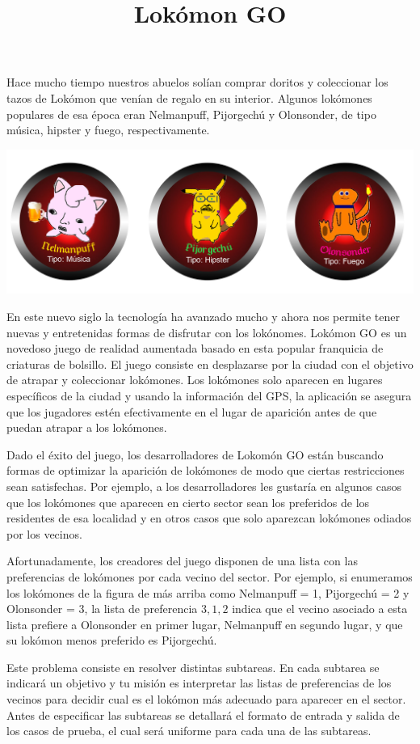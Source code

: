 \documentclass{oci}
\title{Lokómon GO}
\begin{document}
\begin{problemDescription}
Hace mucho tiempo nuestros abuelos solían comprar doritos y coleccionar los
tazos de Lokómon que venían de regalo en su interior.
Algunos lokómones populares de esa época eran Nelmanpuff, Pijorgechú
y Olonsonder, de tipo música, hipster y fuego, respectivamente.

\begin{center}
	\includegraphics[scale=0.4]{lokomons.jpg}
\end{center}

En este nuevo siglo la tecnología ha avanzado mucho y ahora nos permite tener
nuevas y entretenidas formas de disfrutar con los lokónomes.
Lokómon GO es un novedoso juego de realidad aumentada basado en esta popular
franquicia de criaturas de bolsillo.
El juego consiste en desplazarse por la ciudad con el objetivo de atrapar y
coleccionar lokómones.
Los lokómones solo aparecen en lugares específicos de la ciudad y usando la
información del GPS, la aplicación se asegura que los jugadores estén
efectivamente en el lugar de aparición antes de que puedan atrapar a los
lokómones.

Dado el éxito del juego, los desarrolladores de Lokomón GO están buscando formas
de optimizar la aparición de lokómones de modo que ciertas restricciones sean
satisfechas.
Por ejemplo, a los desarrolladores les gustaría en algunos casos que los
lokómones que aparecen en cierto sector sean los preferidos de los residentes de
esa localidad y en otros casos que solo aparezcan lokómones odiados por los
vecinos.

Afortunadamente, los creadores del juego disponen de una lista con las
preferencias de lokómones por cada vecino del sector.
Por ejemplo, si enumeramos los lokómones de la figura de más arriba como
Nelmanpuff = 1, Pijorgechú = 2 y Olonsonder = 3, la lista de preferencia $3, 1,
2$ indica que el vecino asociado a esta lista prefiere a Olonsonder en primer
lugar, Nelmanpuff en segundo lugar, y que su lokómon menos preferido es
Pijorgechú.

Este problema consiste en resolver distintas subtareas.
En cada subtarea se indicará un objetivo y tu misión es interpretar las
listas de preferencias de los vecinos para decidir cual es el lokómon más
adecuado para aparecer en el sector.
Antes de especificar las subtareas se detallará el formato de entrada y salida
de los casos de prueba, el cual será uniforme para cada una de las subtareas.
\end{problemDescription}
\end{document}
